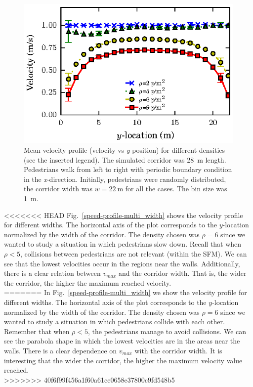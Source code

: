 \begin{figure}[htbp!]
\includegraphics[width=\columnwidth]
{plots/v(y)_width22_k24.eps}
\caption{\label{speed-profile-w22} Mean velocity profile (velocity vs \textit{y}-position) for different densities (see the inserted legend). The simulated corridor was 28~m length. Pedestrians walk from left to right with periodic boundary condition in the \textit{x}-direction. Initially, pedestrians were randomly distributed, the corridor width was $w = 22~$m for all the cases. The bin size was 1~m.}
\end{figure}

<<<<<<< HEAD
Fig.~\ref{speed-profile-multi_width} shows the velocity profile for different widths. The horizontal axis of the plot corresponds to the $y$-location normalized by the width of the corridor. The density chosen was $\rho = 6$ since we wanted to study a situation in which pedestrians slow down. Recall that when $\rho<5$, collisions between pedestrians are not relevant (within the SFM). We can see that the lowest velocities occur in the regions near the walls. Additionally, there is a clear relation between $v_{max}$ and the corridor width. That is, the wider the corridor, the higher the maximum reached velocity.\\
=======
In Fig.~\ref{speed-profile-multi_width} we show the velocity profile for different widths. The horizontal axis of the plot corresponds to the $y$-location normalized by the width of the corridor. The density chosen was $\rho = 6$ since we wanted to study a situation in which pedestrians collide with each other. Remember that when $\rho<5$, the pedestrians manage to avoid collisions. We can see the parabola shape in which the lowest velocities are in the areas near the walls. There is a clear dependence on $v_{max}$ with the corridor width. It is interesting that the wider the corridor, the higher the maximum velocity value reached.\\
>>>>>>> 40f6f99f456a1f60a61ce0658e37800c9fd548b5


